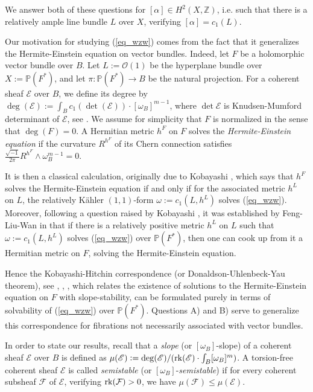 \documentclass[12pt]{article}
\numberwithin{equation}{section}
\theoremstyle{theorem}
\theoremstyle{definition}
\theoremstyle{remark}
\newcommand{\imun} {\sqrt{-1}}
\newcommand{\integ}{\mathbb{Z}}
\newcommand{\rk}[1]{{\rm{rk}} ( #1 )}
\begin{document}
 	We answer both of these questions for $[\alpha] \in H^2(X, \integ)$, i.e. such that there is a relatively ample line bundle $L$ over $X$, verifying $[\alpha] = c_1(L)$.
 	\par 
 	Our motivation for studying (\ref{eq_wzw}) comes from the fact that it generalizes the Hermite-Einstein equation on vector bundles.
 	Indeed, let $F$ be a holomorphic vector bundle over $B$. 
	Let $L := \mathcal{O}(1)$ be the hyperplane bundle over $X := \mathbb{P}(F^*)$, and let $\pi : \mathbb{P}(F^*) \to B$ be the natural projection.
	For a coherent sheaf $\mathscr{E}$ over $B$, we define its degree by $\deg(\mathscr{E}) := \int_B c_1(\det (\mathscr{E})) \cdot [\omega_B]^{m - 1}$, where $\det \mathscr{E}$ is Knudsen-Mumford determinant of $\mathscr{E}$, see \cite{Knudsen1976}.
	We assume for simplicity that $F$ is normalized in the sense that $\deg(F) = 0$.
	A Hermitian metric $h^F$ on $F$ solves the \textit{Hermite-Einstein equation} if the curvature $R^{h^F}$ of its Chern connection satisfies $\frac{\imun}{2 \pi} R^{h^F} \wedge \omega_B^{m-1} = 0$. 
	\par 
	It is then a classical calculation, originally due to Kobayashi \cite{KobFinEins}, which says that $h^F$ solves the Hermite-Einstein equation if and only if for the associated metric $h^L$ on $L$, the relatively Kähler $(1, 1)$-form $\omega := c_1(L, h^L)$ solves (\ref{eq_wzw}).
	Moreover, following a question raised by Kobayashi \cite{KobFinEins}, it was established by Feng-Liu-Wan in \cite[Proposition 3.5]{FengLiuWang} that if there is a relatively positive metric $h^L$ on $L$ such that $\omega := c_1(L, h^L)$ solves (\ref{eq_wzw}) over $\mathbb{P}(F^*)$, then one can cook up from it a Hermitian metric on $F$, solving the Hermite-Einstein equation.
	\par 
	Hence the Kobayashi-Hitchin correspondence (or Donaldson-Uhlenbeck-Yau theorem), see \cite{DonaldASD}, \cite{UhlYau}, \cite[Theorems 6.10.13]{KobaVB}, which relates the existence of solutions to the Hermite-Einstein equation on $F$ with slope-stability, can be formulated purely in terms of solvability of (\ref{eq_wzw}) over $\mathbb{P}(F^*)$.
	Questions A) and B) serve to generalize this correspondence for fibrations not necessarily associated with vector bundles.
 	\par
	In order to state our results, recall that a \textit{slope} (or $[\omega_B]$-slope) of a coherent sheaf $\mathscr{E}$ over $B$ is defined as $\mu(\mathscr{E}) := \deg(\mathscr{E}) / (\rk{\mathscr{E}} \cdot \int_B [\omega_B]^m)$.
	A torsion-free coherent sheaf $\mathscr{E}$ is called \textit{semistable} (or $[\omega_B]$-\textit{semistable}) if for every coherent subsheaf $\mathcal{F}$ of $\mathscr{E}$, verifying $\rk{\mathcal{F}} > 0$, we have $\mu(\mathcal{F}) \leq \mu(\mathscr{E})$.
\end{document}
